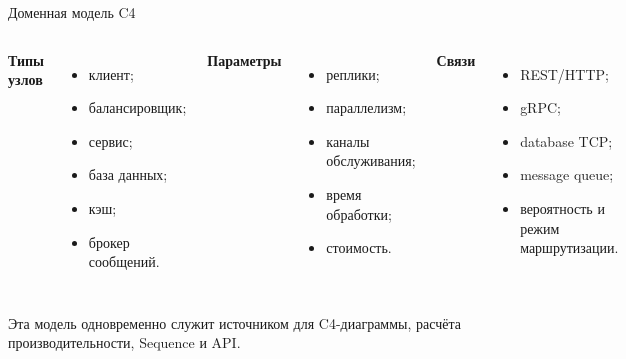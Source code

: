 \documentclass[aspectratio=169,10pt]{beamer}
\newcommand{\muted}[1]{{\color{Muted}\footnotesize #1}}
\begin{document}
\begin{frame}{Доменная модель C4}
  \begin{columns}[T,onlytextwidth]
      \textbf{Типы узлов}
      \begin{itemize}
        \item клиент;
        \item балансировщик;
        \item сервис;
        \item база данных;
        \item кэш;
        \item брокер сообщений.
      \end{itemize}
      \textbf{Параметры}
      \begin{itemize}
        \item реплики;
        \item параллелизм;
        \item каналы обслуживания;
        \item время обработки;
        \item стоимость.
      \end{itemize}
      \textbf{Связи}
      \begin{itemize}
        \item REST/HTTP;
        \item gRPC;
        \item database TCP;
        \item message queue;
        \item вероятность и режим маршрутизации.
      \end{itemize}
  \end{columns}
  \vfill
  \muted{Эта модель одновременно служит источником для C4-диаграммы, расчёта производительности, Sequence и API.}
\end{frame}
\end{document}
